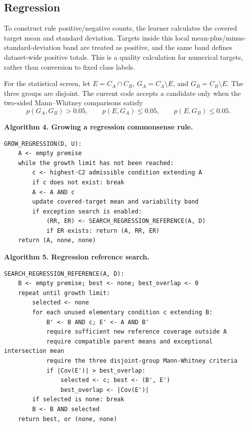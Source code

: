\subsection{Regression}
\label{algorithm-regression}
To construct rule positive/negative counts,
the learner calculates the covered target mean and standard deviation. Targets
inside this local mean-plus/minus-standard-deviation band are treated as
positive, and the same band defines dataset-wide positive totals. This is a
quality calculation for numerical targets, rather than conversion to fixed
class labels.

For the statistical screen, let $E=C_A\cap C_B$, $G_A=C_A\setminus E$,
and $G_B=C_B\setminus E$. The three groups are disjoint. The current code
accepts a candidate only when the two-sided Mann--Whitney comparisons satisfy
\[
p(G_A,G_B)>0.05,\qquad p(E,G_A)\leq0.05,\qquad p(E,G_B)\leq0.05.
\]


\noindent\begin{minipage}{\linewidth}
\textbf{Algorithm 4. Growing a regression commonsense rule.}


\begin{Verbatim}[fontsize=\scriptsize,frame=single,samepage=true]
GROW_REGRESSION(D, U):
    A <- empty premise
    while the growth limit has not been reached:
        c <- highest-C2 admissible condition extending A
        if c does not exist: break
        A <- A AND c
        update covered-target mean and variability band
        if exception search is enabled:
            (RR, ER) <- SEARCH_REGRESSION_REFERENCE(A, D)
            if ER exists: return (A, RR, ER)
    return (A, none, none)
\end{Verbatim}
\end{minipage}
\noindent\begin{minipage}{\linewidth}
\textbf{Algorithm 5. Regression reference search.}


\begin{Verbatim}[fontsize=\scriptsize,frame=single,samepage=true]
SEARCH_REGRESSION_REFERENCE(A, D):
    B <- empty premise; best <- none; best_overlap <- 0
    repeat until growth limit:
        selected <- none
        for each unused elementary condition c extending B:
            B' <- B AND c; E' <- A AND B'
            require sufficient new reference coverage outside A
            require compatible parent means and exceptional intersection mean
            require the three disjoint-group Mann-Whitney criteria
            if |Cov(E')| > best_overlap:
                selected <- c; best <- (B', E')
                best_overlap <- |Cov(E')|
        if selected is none: break
        B <- B AND selected
    return best, or (none, none)
\end{Verbatim}
\end{minipage}

